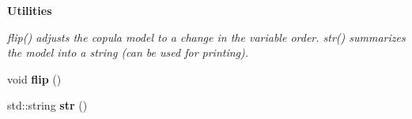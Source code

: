 \begin{Indent}{\bf Utilities}\par
{\em {\ttfamily flip()} adjust\textquotesingle{}s the copula model to a change in the variable order. {\ttfamily str()} summarizes the model into a string (can be used for printing). }\begin{DoxyCompactItemize}
\item 
void {\bfseries flip} ()\hypertarget{classvinecopulib_1_1_bicop_a59b7087b3857350df25ff684ab96f377}{}\label{classvinecopulib_1_1_bicop_a59b7087b3857350df25ff684ab96f377}

\item 
std\+::string {\bfseries str} ()\hypertarget{classvinecopulib_1_1_bicop_a94b889d56f478dbeb156be4e31af5de5}{}\label{classvinecopulib_1_1_bicop_a94b889d56f478dbeb156be4e31af5de5}

\end{DoxyCompactItemize}
\end{Indent}

